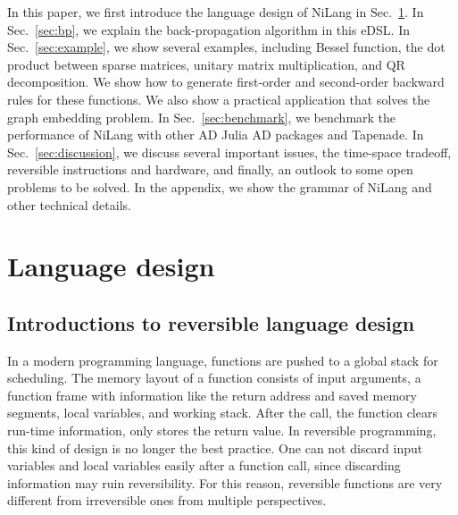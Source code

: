 \documentclass{article}
\newcommand{\<}{\langle}
\renewcommand{\>}{\rangle}
\newcommand{\Sec}[1]{Sec.~\ref{#1}}
\theoremstyle{definition}\newtheorem{definition}{\textit{Definition}}
\begin{document}
    In this paper, we first introduce the language design of NiLang in \Sec{sec:lang}.
    In \Sec{sec:bp}, we explain the back-propagation algorithm in this eDSL.
    In \Sec{sec:example}, we show several examples, including Bessel function, the dot product between sparse matrices, unitary matrix multiplication, and QR decomposition. We show how to generate first-order and second-order backward rules for these functions. We also show a practical application that solves the graph embedding problem.
    In \Sec{sec:benchmark}, we benchmark the performance of NiLang with other AD Julia AD packages and Tapenade.
    In \Sec{sec:discussion}, we discuss several important issues, the time-space  tradeoff, reversible instructions and hardware, and finally, an outlook to some open problems to be solved.
    In the appendix, we show the grammar of NiLang and other technical details.


\section{Language design}\label{sec:lang}

    \subsection{Introductions to reversible language design}
    In a modern programming language, functions are pushed to a global stack for scheduling. The memory layout of a function consists of input arguments, a function frame with information like the return address and saved memory segments, local variables, and working stack. After the call, the function clears run-time information, only stores the return value. In reversible programming, this kind of design is no longer the best practice. One can not discard input variables and local variables easily after a function call, since discarding information may ruin reversibility. For this reason, reversible functions are very different from irreversible ones from multiple perspectives.
\end{document}

